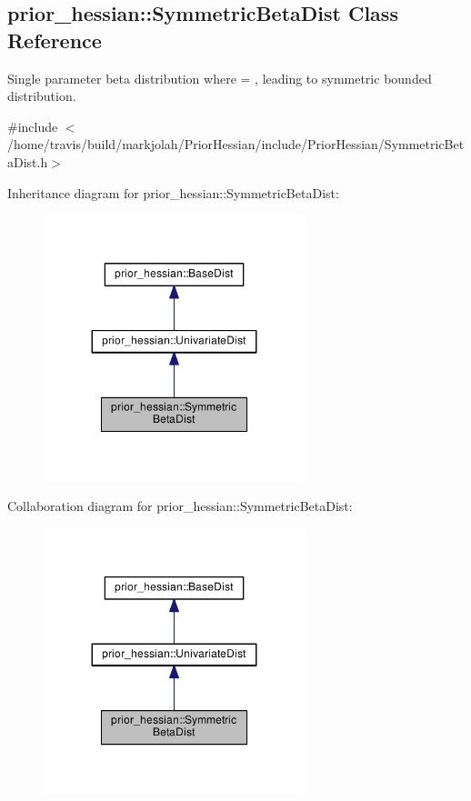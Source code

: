 \hypertarget{classprior__hessian_1_1SymmetricBetaDist}{}\subsection{prior\+\_\+hessian\+:\+:Symmetric\+Beta\+Dist Class Reference}
\label{classprior__hessian_1_1SymmetricBetaDist}


Single parameter beta distribution where  = , leading to symmetric bounded distribution.  




{\ttfamily \#include $<$/home/travis/build/markjolah/\+Prior\+Hessian/include/\+Prior\+Hessian/\+Symmetric\+Beta\+Dist.\+h$>$}



Inheritance diagram for prior\+\_\+hessian\+:\+:Symmetric\+Beta\+Dist\+:\nopagebreak
\begin{figure}[H]
\begin{center}
\leavevmode
\includegraphics[width=215pt]{classprior__hessian_1_1SymmetricBetaDist__inherit__graph}
\end{center}
\end{figure}


Collaboration diagram for prior\+\_\+hessian\+:\+:Symmetric\+Beta\+Dist\+:\nopagebreak
\begin{figure}[H]
\begin{center}
\leavevmode
\includegraphics[width=215pt]{classprior__hessian_1_1SymmetricBetaDist__coll__graph}
\end{center}
\end{figure}
